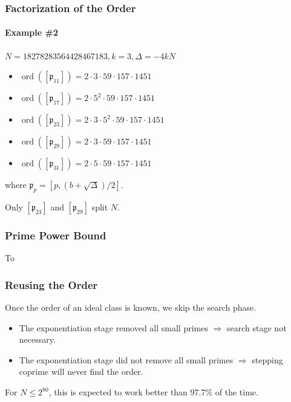 \documentclass{beamer}
\DeclareMathOperator{\ord}{ord}
\newcommand{\ideal}{\mathfrak}
\newcommand{\idealclass}[1]{\left[ \ideal #1 \right]}
\begin{document}
\begin{frame}
\frametitle{Factorization of the Order}
\framesubtitle{Example \#2}

$N = 18278283564428467183, k = 3, \Delta = -4kN$
\begin{itemize}
\item $\ord(\idealclass{p_{11}}) = 2 \cdot 3 \cdot 59 \cdot 157 \cdot 1451$
\item $\ord(\idealclass{p_{17}}) = 2 \cdot 5^2 \cdot 59 \cdot 157 \cdot 1451$
\item $\ord(\idealclass{p_{23}}) = 2 \cdot 3 \cdot 5^2 \cdot 59 \cdot 157 \cdot 1451$
\item $\ord(\idealclass{p_{29}}) = 2 \cdot 3 \cdot 59 \cdot 157 \cdot 1451$
\item $\ord(\idealclass{p_{31}}) = 2 \cdot 5 \cdot 59 \cdot 157 \cdot 1451$
\end{itemize}

where $\ideal p_p = [p, (b + \sqrt\Delta)/2]$.

\bigskip
Only $\idealclass{p_{23}}$ and $\idealclass{p_{29}}$ split $N$.

\end{frame}

\begin{frame}
\frametitle{Prime Power Bound}
To 

\end{frame}

\begin{frame}
\frametitle{Reusing the Order}

Once the order of an ideal class is known, we skip the search phase.

\begin{itemize}
\item The exponentiation stage removed all small primes $\Rightarrow$ search stage not necessary.

\item The exponentiation stage did not remove all small primes $\Rightarrow$ stepping coprime will never find the order.
\end{itemize}

For $N \le 2^{80}$, this is expected to work better than 97.7\% of the time.

\end{frame}
\end{document}
